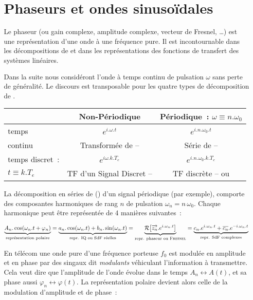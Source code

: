 \chapter{Phaseurs et ondes sinusoïdales}

Le phaseur (ou gain complexe, amplitude complexe, vecteur de Fresnel,
\dots) est une représentation d'une onde à une fréquence pure. Il est
incontournable dans les décompositions de \Fourier{} et dans les
représentations des fonctions de transfert des systèmes linéaires.

Dans la suite nous considéront l'onde à temps continu de pulsation
$\omega$ sans perte de généralité. Le discours est transposable pour
les quatre types de décomposition de \Fourier{}.

\begin{table}[h!]
\begin{tabular}{l|c|c}
              & Non-Périodique              & Périodique~: $\omega\equiv n.\omega_0$\\ \hline
temps  & $e^{i.\omega.t}$      &  $e^{i.n.\omega_0.t}$              \\
 continu & Transformée de \Fourier{} -- \TF{}     &  Série de \Fourier{} -- \sdf{}             \\\hline
  temps discret~: & $e^{i \omega. k. T_e}$   &  $e^{i.n.\omega_0. k. T_e}$       \\
  $t\equiv k.T_e$ & TF d'un Signal Discret -- \TFSD{}  &  TF discrète -- \TFD{} ou \FFT{}               
\end{tabular}
\end{table}



La décomposition en séries de \Fourier{} (\sdf{}) d'un signal
périodique (par exemple), comporte des composantes harmoniques de rang
$n$ de pulsation $\omega_n=n\,\omega_0$. Chaque harmonique peut être
représentée de 4 manières suivantes~:

\begin{equation}
  \underbrace{ A_n.\cos(\omega_n.t+\varphi_n)}_{\text{représentation polaire}} = \underbrace{a_n.\cos(\omega_n.t) + b_n.\sin(\omega_n.t)}_{\text{repr. IQ ou SdF{} réelles}} = \underbrace{\mathcal{R}\!\left[\overrightarrow{z_n}. e^ {i.\omega_n.t}\right]}_{\text{repr. phaseur ou \textsc{Fresnel}{}}}= \underbrace{c_n.e^ {i.\omega_n.t} + \overline{c_n}.e^ {-i.\omega_n.t}}_{\text{repr. SdF{} complexes}}
  \label{phaseur_egalites}
\end{equation}


En télécom une onde pure d'une fréquence porteuse $f_0$ est modulée en
amplitude et en phase par des singaux dit \emph{modulants} véhiculant
l'information à transmettre.  Cela veut dire que l'amplitude de l'onde
évolue dans le temps $A_n\leftrightarrow A(t)$, et sa phase aussi
$\varphi_n \leftrightarrow \varphi(t)$. La représentation polaire
devient alors celle de la modulation d'amplitude et de phase~:


